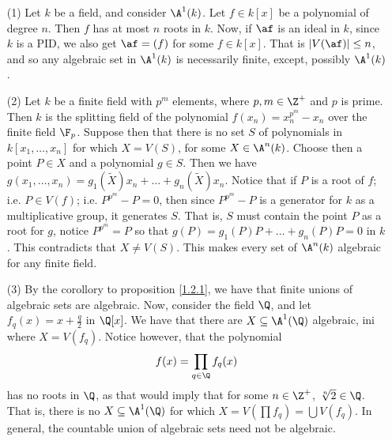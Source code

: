 \begin{example}\label{example_1.5}
    \begin{enumerate}
        \item[(1)] Let $k$ be a field, and consider  $\A^1(k)$. Let $f \in k[x]$
           be a polynomial of degree $n$. Then $f$ has at most $n$ roots in $k$.
           Now, if  $\af$ is an ideal in $k$, since $k$ is a PID, we also get
           $\af=(f)$ for some $f \in k[x]$. That is $|V(\af)| \leq n$, and so
           any algebraic set in $\A^1(k)$ is necessarily finite, except,
           possibly $\A^1(k)$.

       \item[(2)] Let $k$ be a finite field with  $p^m$ elements, where  $p,m
           \in \Z^+$ and $p$ is prime. Then $k$ is the splitting field of the
           polynomial $f(x_n)=x_n^{p^m}-x_n$ over the finite field $\F_p$.
           Suppose then that there is no set $S$ of polynomials in $k[x_1,
           \dots, x_n]$ for which $X=V(S)$, for some $X \in \A^n(k)$. Choose
           then a point $P \in X$ and a polynomial $g \in S$. Then we have
           $g(x_1, \dots,x_n)=g_1(\tilde{X})x_n+\dots+g_n(\tilde{X})x_n$. Notice
           that if $P$ is a root of $f$; i.e. $P \in V(f)$; i.e. $P^{p^m}-P=0$,
           then since $P^{p^m}-P$ is a generator for $k$ as a multiplicative
           group, it generates $S$. That is, $S$ must contain the point $P$ as a
           root for $g$, notice  $P^{p^m}=P$ so that
           $g(P)=g_1(P)P+\dots+g_n(P)P=0$ in $k$. This contradicts that $X \neq
           V(S)$. This makes every set of $\A^n(k)$ algebraic for any finite
           field.

       \item[(3)] By the corollory to proposition \ref{1.2.1}, we have that finite
           unions of algebraic sets are algebraic. Now, consider the field $\Q$,
           and let $f_q(x)=x+\frac{q}{2}$ in $\Q[x]$. We have that there are $X
           \subseteq \A^1(\Q)$ algebraic, ini where $X=V(f_q)$. Notice however,
           that the polynomial
           \begin{equation*}
               f(x)=\prod_{q \in \Q}{f_q(x)}
           \end{equation*}
           has no roots in $\Q$, as that would imply that for some  $n \in
           \Z^+$,  $\sqrt[n]{2} \in \Q$. That is, there is no $X \subseteq
           \A^1(\Q)$ for which $X=V(\prod{f_q})=\bigcup{V(f_q)}$. In general,
           the countable union of algebraic sets need not be algebraic.
    \end{enumerate}
\end{example}

